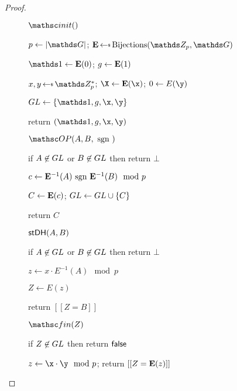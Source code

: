 \begin{proof}
\begin{figure}[tp]
\begin{minipage}[t]{0.49\textwidth}
			\begin{oracle}{$\Initialize()$}
				\item $p \gets |\group|$; $\E \getsr \Bijections(\ZZ_p, \group)$
				\item $\one \gets \E(0)$; $g\gets \mathbf{E}(1)$
				\item $x,y \getsr \ZZ_p^*$; $\X \gets \E(\x)$; $\Y\gets E(\y)$
				\item $\GL \gets \{\one,\generator,\x,\y\}$
				\item return $(\one,\generator,\x,\y)$
			\end{oracle}
			\ExptSepSpace
			\begin{oracle}{$\OP(A,B,\sgn)$}
				\item if $A \not \in GL$ or $B \not \in GL$ then return $\bot$
				\item $c \gets \mathbf{E}^{-1}(A) \text{ sgn } \mathbf{E}^{-1}(B) \mod p$
				\item $C \gets \mathbf{E}(c)$; $GL \gets GL \cup \{C\}$
				\item return $C$
			\end{oracle}
			\end{minipage}
		\begin{minipage}[t]{0.49\textwidth}
		\ExptSepSpace
			\begin{oracle}{$\mathsf{stDH}(A,B)$}
				\item if $A \not \in GL$ or $B \not \in GL$ then return $\bot$
				\item $z \gets x \cdot E^{-1}(A) \mod p$
				\item $Z \gets E(z)$
				\item return $[[Z=B]]$
			\end{oracle}
			\ExptSepSpace
			\begin{oracle}{$\Finalize(Z)$}
				\item if $Z \not \in GL$ then return $\mathsf{false}$
				\item $z \gets \x \cdot \y \mod p$; return $[[Z = \mathbf{E}(z)]]$
			\end{oracle}
		\end{minipage}
		

\end{figure}
\end{proof}
